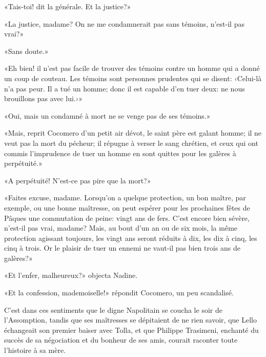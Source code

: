 «Tais-toi! dit la générale. Et la justice?»

«La justice, madame? On ne me condamnerait pas sans témoins, n'est-il
pas vrai?»

«Sans doute.»

«Eh bien! il n'est pas facile de trouver des témoins contre un homme qui
a donné un coup de couteau. Les témoins sont personnes prudentes qui se
disent: ‹Celui-là n'a pas peur. Il a tué un homme; donc il est capable
d'en tuer deux: ne nous brouillons pas avec lui.›»

«Oui, mais un condamné à mort ne se venge pas de ses témoins.»

«Mais, reprit Cocomero d'un petit air dévot, le saint père est galant
homme; il ne veut pas la mort du pécheur; il répugne à verser le sang
chrétien, et ceux qui ont commis l'imprudence de tuer un homme en sont
quittes pour les galères à perpétuité.»

«A perpétuité! N'est-ce pas pire que la mort?»

«Faites excuse, madame. Lorsqu'on a quelque protection, un bon maître,
par exemple, ou une bonne maîtresse, on peut espérer pour les prochaines
fêtes de Pâques une commutation de peine: vingt ans de fers. C'est
encore bien sévère, n'est-il pas vrai, madame? Mais, au bout d'un an ou
de six mois, la même protection agissant toujours, les vingt ans seront
réduits à dix, les dix à cinq, les cinq à trois. Or le plaisir de tuer
un ennemi ne vaut-il pas bien trois ans de galères?»

«Et l'enfer, malheureux?» objecta Nadine.

«Et la confession, mademoiselle!» répondit Cocomero, un peu scandalisé.

C'est dans ces sentiments que le digne Napolitain se coucha le soir de
l'Assomption, tandis que ses maîtresses se dépitaient de ne rien savoir,
que Lello échangeait son premier baiser avec Tolla, et que Philippe
Trasimeni, enchanté du succès de sa négociation et du bonheur de ses
amis, courait raconter toute l'histoire à sa mère.

